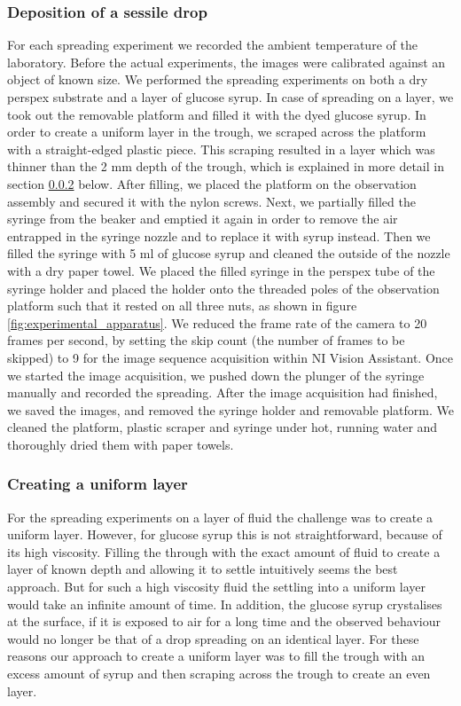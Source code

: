 \documentclass[aip,graphicx]{revtex4-1}
\begin{document}
\subsubsection{Deposition of a sessile drop}

For each spreading experiment we recorded the ambient temperature of the laboratory. 
Before the actual experiments, the images were calibrated against an object of known size.
We performed the spreading experiments on both a dry perspex substrate and a layer of glucose syrup.
In case of spreading on a layer, we took out the removable platform and filled it with the dyed glucose syrup. 
In order to create a uniform layer in the trough, we scraped across the platform with a straight-edged plastic piece. 
This scraping resulted in a layer which was thinner than the 2 mm depth of the trough, which is explained in more detail in section \ref{sec:creating_layer} below.
After filling, we placed the platform on the observation assembly and secured it with the nylon screws. 
Next, we partially filled the syringe from the beaker and emptied it again in order to remove the air entrapped in the syringe nozzle and to replace it with syrup instead. 
Then we filled the syringe with 5 ml of glucose syrup and cleaned the outside of the nozzle with a dry paper towel.
We placed the filled syringe in the perspex tube of the syringe holder and placed the holder onto the threaded poles of the observation platform such that it rested on all three nuts, as shown in figure \ref{fig:experimental_apparatus}. 
We reduced the frame rate of the camera to 20 frames per second, by setting the skip count (the number of frames to be skipped) to 9 for the image sequence acquisition within NI Vision Assistant. 
Once we started the image acquisition, we pushed down the plunger of the syringe manually and recorded the spreading. 
After the image acquisition had finished, we saved the images, and removed the syringe holder and removable platform. 
We cleaned the platform, plastic scraper and syringe under hot, running water and thoroughly dried them with paper towels.

\subsubsection{Creating a uniform layer}
\label{sec:creating_layer}

For the spreading experiments on a layer of fluid the challenge was to create a uniform layer.
However, for glucose syrup this is not straightforward, because of its high viscosity.
Filling the through with the exact amount of fluid to create a layer of known depth and allowing it to settle intuitively seems the best approach.
But for such a high viscosity fluid the settling into a uniform layer would take an infinite amount of time.
In addition, the glucose syrup crystalises at the surface, if it is exposed to air for a long time and the observed behaviour would no longer be that of a drop spreading on an identical layer.
For these reasons our approach to create a uniform layer was to fill the trough with an excess amount of syrup and then scraping across the trough to create an even layer.
 
\end{document}
